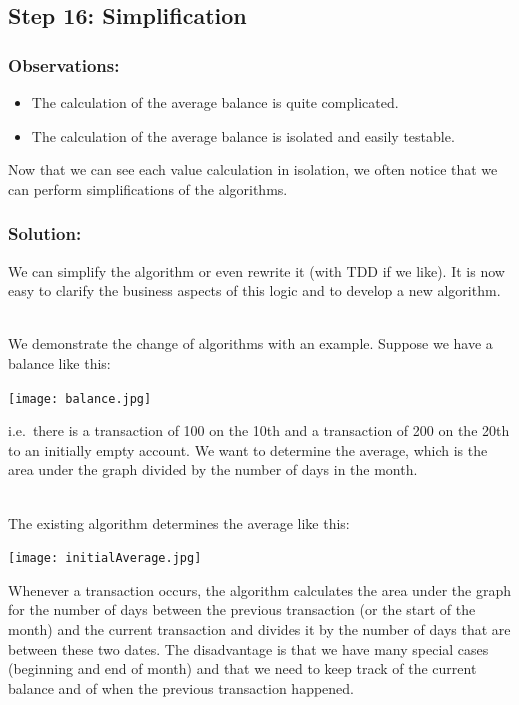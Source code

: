 \documentclass[a4paper,fleqn,titlepage,11pt]{article}
\begin{document}
\subsection*{Step 16: Simplification}

\subsubsection*{Observations:}
\begin{itemize}
\item The calculation of the average balance is quite complicated.
\item The calculation of the average balance is isolated and easily testable.
\end{itemize}

Now that we can see each value calculation in isolation, we often notice that we can perform simplifications of the algorithms. 

\subsubsection*{Solution:}

We can simplify the algorithm or even rewrite it (with TDD if we like). It is now easy to clarify the business aspects of this logic and to develop a new algorithm. 
\\~

We demonstrate the change of algorithms with an example.
Suppose we have a balance like this:

\texttt{[image: balance.jpg]}

i.e.~there is a transaction of 100 on the 10th and a transaction of 200 on the 20th to an initially empty account.
We want to determine the average, which is the area under the graph divided by the number of days in the month.
\\~

The existing algorithm determines the average like this:

\texttt{[image: initialAverage.jpg]}

Whenever a transaction occurs, the algorithm calculates the area under the graph for the number of days between the previous transaction (or the start of the month) and the current transaction and divides it by the number of days that are between these two dates. The disadvantage is that we have many special cases (beginning and end of month) and that we need to keep track of the current balance and of when the previous transaction happened.
\\~
\end{document}
